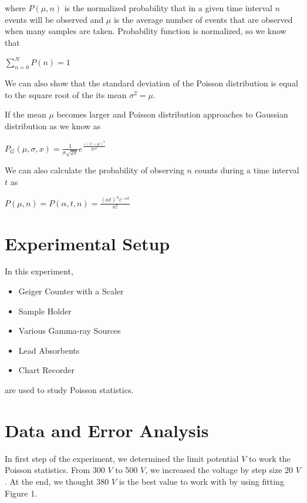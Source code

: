 \documentclass[aps,twocolumn,secnumarabic,nobalancelastpage,amsmath,amssymb,
nofootinbib]{revtex4}
\begin{document}
where $P(\mu,n)$ is the normalized probability that in a given time interval $n$ events will be 
observed and $\mu$ is the average number of events that are observed when many samples 
are taken. Probability function is normalized, so we know that 
\begin{center}
$ \sum _{ n=0 }^{ N }{ P(n) } =1$
\end{center}

We can also show that the standard deviation of the Poisson distribution is equal to the square root of the its mean ${\sigma}^{2}=\mu$.

If the mean $\mu$ becomes larger and Poisson distribution approaches to Gaussian distribution as we know as

\begin{center}
$P_{G}(\mu,\sigma,x)=\frac{1}{\sigma{\sqrt{2\pi}}}{e}^{\frac{-{(x-\mu)}^{2}}{2{\sigma}^{2}}}$
\end{center}

We can also calculate the probability of observing $n$ counts during a time interval $t$ as

\begin{center}
$P(\mu,n)=P(\alpha,t,n)=\frac{{(\alpha{t})}^{n}{e}^{-\alpha{t}}}{n!}$
\end{center}


\section{Experimental Setup}

In this experiment, 

\begin{itemize}
\item Geiger Counter with a Scaler
\item Sample Holder
\item Various Gamma-ray Sources
\item Lead Absorbents 
\item Chart Recorder
\end{itemize}

are used to study Poisson statistics.
 
\section{Data and Error Analysis}
In first step of the experiment, we determined the limit potential $V$ to work the Poisson statistics. From 300 $V$ to 500 $V$, we increased the voltage by step size 20 $V$. At the end, we thought 380 $V$ is the best value to work with by using fitting Figure 1. 
\end{document}
